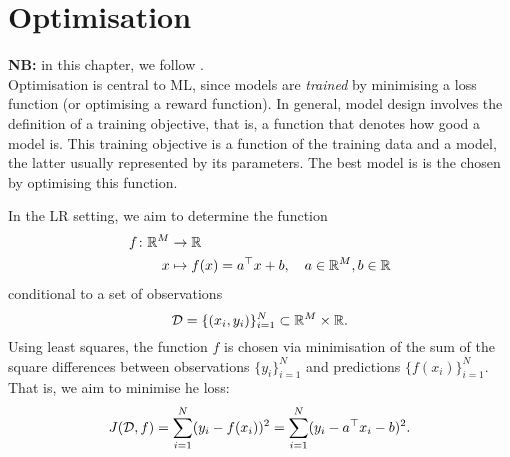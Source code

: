 

\section{Optimisation}
\label{cap:optimisation}

\textbf{NB:} in this chapter, we follow \cite{pml1Book}.\\

\noindent Optimisation is central to ML, since models are \emph{trained} by minimising a loss function (or optimising a reward function). In general, model design involves the definition of a training objective, that is, a function that denotes how good a model is. This training objective is a function of the training data and a model, the latter usually represented by its parameters. The best model is is the chosen by optimising this function. 

\begin{mdframed}[style=ejemplo, frametitle={\center Example: Linear regression (LR)}]

In the LR setting, we aim to determine the function
\begin{align}
  f \colon \mathbb{R}^M &\to \mathbb{R}\nonumber\\
  x &\mapsto f(x)=a^\top x + b,\quad a\in\mathbb{R}^M,b\in\mathbb{R}
   \label{eq:reg_lin_fn} 
\end{align}
conditional to a set of observations
\begin{equation}
	{\mathcal D}=\{(x_i,y_i)\}_{i=1}^N\subset \mathbb{R}^M \times \mathbb{R}.
	\label{eq:training_set}
\end{equation}
 Using least squares, the function $f$ is chosen via minimisation of the sum of the square differences between observations $\{y_i\}_{i=1}^N$ and predictions $\{f(x_i)\}_{i=1}^N$. That is, we aim to minimise he loss:
\begin{equation}
	J({\mathcal D},f) = \sum_{i=1}^N(y_i-f(x_i))^2 = \sum_{i=1}^N(y_i-a^
	\top x_i - b)^2.
	\label{eq:least_squares_cost}
\end{equation}

\end{mdframed}


